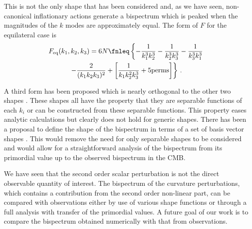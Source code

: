 This is not the only shape
that has been considered and, as we have seen, non-canonical inflationary actions generate a
bispectrum which is peaked
when the magnitudes of the $k$ modes are approximately equal. The form of $F$ for the equilateral
case is \cite{Komatsu:2010fb}
% 
\begin{multline}
 F_\mathrm{eq}(k_1,k_2,k_3) = 6 N \fnleq \left\{ -\frac{1}{k_1^3 k_2^3} -\frac{1}{k_2^3 k_3^3}
                                -\frac{1}{k_3^3 k_1^3}  \right.\\
                                \left.-\frac{2}{(k_1 k_2 k_3)^2}  + \left[ \frac{1}{k_1 k_2^2 k_3^3}
+ \mathrm{5 perms} \right]
                                \right\} \,.
\end{multline}
% 

A third form has been proposed which is nearly orthogonal to the other two shapes
\cite{Senatore:2009gt}. These shapes all have the property that they are separable functions of
each $k_i$ or can be constructed from these separable functions. This property eases analytic
calculations but clearly does not hold for generic shapes. 
% 
There has been a proposal to define the
shape of the bispectrum in terms of a set of basis vector shapes
\cite{Fergusson:2009nv,Liguori:2010hx}. This would remove the need for only separable shapes to be
considered and would allow for a straightforward analysis of the bispectrum from its primordial
value up to the observed bispectrum in the CMB. 

We have seen that the second order scalar perturbation is not the direct observable quantity of
interest. The bispectrum of the curvature perturbations, which contains a contribution from the
second order non-linear part, can be compared with observations either by use of various
shape functions or through a full analysis with transfer of the primordial values. A future goal of
our work is to compare the bispectrum obtained numerically with that from observations.




